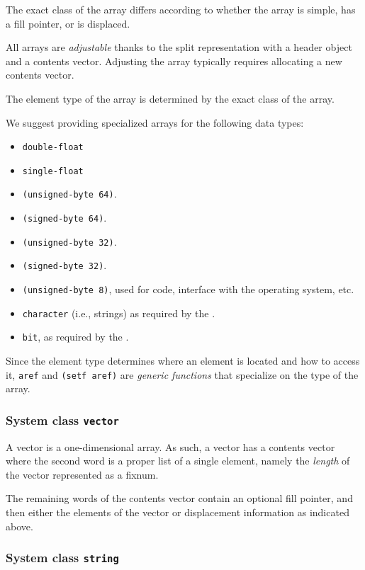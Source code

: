 The exact class of the array differs according to whether the array is
simple, has a fill pointer, or is displaced. 

All arrays are \emph{adjustable} thanks to the split representation
with a header object and a contents vector.  Adjusting the array
typically requires allocating a new contents vector. 

The element type of the array is determined by the exact class of the
array. 

We suggest providing specialized arrays for the following data types:

\begin{itemize}
\item \texttt{double-float}
\item \texttt{single-float}
\item \texttt{(unsigned-byte 64)}.
\item \texttt{(signed-byte 64)}.
\item \texttt{(unsigned-byte 32)}.
\item \texttt{(signed-byte 32)}.  
\item \texttt{(unsigned-byte 8)}, used for code, interface with the
  operating system, etc. 
\item \texttt{character} (i.e., strings) as required by the \hs{}.
\item \texttt{bit}, as required by the \hs{}.
\end{itemize}

Since the element type determines where an element is located and how
to access it, \texttt{aref} and \texttt{(setf aref)} are \emph{generic
  functions} that specialize on the type of the array. 

\subsubsection{System class \texttt{vector}}

A vector is a one-dimensional array.  As such, a vector has a contents
vector where the second word is a proper list of a single element,
namely the \emph{length} of the vector represented as a fixnum. 

The remaining words of the contents vector contain an optional fill
pointer, and then either the elements of the vector or displacement
information as indicated above. 

\subsubsection{System class \texttt{string}}

